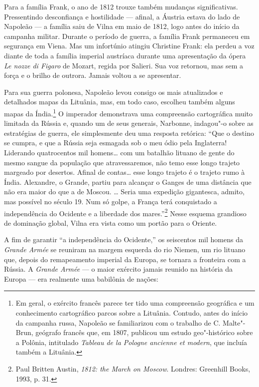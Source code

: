 Para a família Frank, o ano de 1812 trouxe também mudanças
significativas. Pressentindo desconfiança e hostilidade --- afinal, a
Áustria estava do lado de Napoleão --- a família saiu de Vilna em maio de
1812, logo antes do início da campanha militar. Durante o período de
guerra, a família Frank permaneceu em segurança em Viena. Mas um
infortúnio atingiu Christine Frank: ela perdeu a voz diante de toda a
família imperial austríaca durante uma apresentação da ópera \textit{Le
nozze di Figaro} de Mozart, regida por Salieri. Sua voz retornou, mas
sem a força e o brilho de outrora. Jamais voltou a se apresentar.

\asterisc

Para sua guerra polonesa, Napoleão levou consigo os mais atualizados e
detalhados mapas da Lituânia, mas, em todo caso, escolheu também alguns
mapas da Índia.\footnote{Em geral, o exército francês parece ter tido uma compreensão geográfica e um conhecimento cartográfico parcos sobre a Lituânia. Contudo, antes do início da campanha russa, Napoleão se familiarizou com o trabalho de C. Malte"-Brun, geógrafo francês que, em 1807, publicou um estudo geo"-histórico sobre a Polônia, intitulado \textit{Tableau de la Pologne ancienne et modern}, que incluía também a Lituânia.} O imperador demonstrava uma compreensão cartográfica muito limitada da Rússia e, quando um de seus generais, Narbonne, indagou"-o
sobre as estratégias de guerra, ele simplesmente deu uma resposta
retórica: ``Que o destino se cumpra, e que a Rússia seja esmagada sob o
meu ódio pela Inglaterra! Liderando quatrocentos mil homens\ldots{} com
um batalhão lituano de gente do mesmo sangue da população que
atravessaremos, não temo esse longo trajeto margeado por desertos.
Afinal de contas\ldots{} esse longo trajeto é o trajeto rumo à Índia.
Alexandre, o Grande, partiu para alcançar o Ganges de uma distância que
não era maior do que a de Moscou. \ldots{} Seria uma expedição
gigantesca, admito, mas possível no século 19. Num só golpe, a França
terá conquistado a independência do Ocidente e a liberdade dos
mares.''\footnote{Paul Britten Austin, \textit{1812: the March on Moscow}. Londres: Greenhill Books, 1993, p. 31.} Nesse esquema grandioso de dominação global, Vilna era vista como um portão
para o Oriente.

A fim de garantir ``a independência do Ocidente,'' os seiscentos mil
homens da \textit{Grande Armée} se reuniram na margem esquerda do rio
Niemen, um rio lituano que, depois do remapeamento imperial da Europa,
se tornara a fronteira com a Rússia. A \textit{Grande Armée} --- o maior
exército jamais reunido na história da Europa --- era realmente uma
babilônia de nações:

